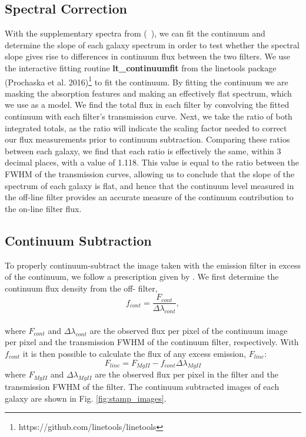 \documentclass[twocolumn]{aastex61}
\newcommand{\citeth}[1]{(\citeauthor{#1}\ \citeyear{#1})}
\begin{document}
\subsection{Spectral Correction}
With the supplementary spectra from \citeth{Rubin_2014}, we can fit the continuum and determine the slope of each galaxy spectrum in order to test whether the spectral slope gives rise to differences in continuum flux between the two filters. We use the interactive fitting routine \textbf{lt\_continuumfit} from the linetools package (Prochaska et al. 2016)\footnote{https://github.com/linetools/linetools}\nocite{Prochaska2016} to fit the continuum. By fitting the continuum we are masking the absorption features and making an effectively flat spectrum, which we use as a model. We find the total flux in each filter by convolving the fitted continuum with each filter's transmission curve. Next, we take the ratio of both integrated totals, as the ratio will indicate the scaling factor needed to correct our flux measurements prior to continuum subtraction. Comparing these ratios between each galaxy, we find that each ratio is effectively the same, within 3 decimal places, with a value of 1.118. This value is equal to the ratio between the FWHM of the transmission curves, allowing us to conclude that the slope of the spectrum of each galaxy is flat, and hence that the continuum level measured in the off-line filter provides an accurate measure of the continuum contribution to the on-line filter flux.

\subsection{Continuum Subtraction}\label{sec.cont_sub}
To properly continuum-subtract the image taken with the emission filter in excess of the continuum, we follow a prescription given by \cite{Battaia_2015}. 
We first determine the continuum flux density from the off- filter,
\begin{equation}
f_{cont}=\frac{F_{cont}}{\Delta \lambda_{cont}},
\end{equation}\\
where $F_{cont}$ and $\Delta \lambda_{cont}$ are the observed flux per pixel of the continuum image per pixel and the transmission FWHM of the continuum filter, respectively. With $f_{cont}$ it is then possible to calculate the flux of any excess emission, $F_{line}$:
\begin{equation}
F_{line}=F_{MgII}-f_{cont} \Delta \lambda_{MgII}
\label{eq:subtraction}
\end{equation}
where $F_{MgII}$ and $\Delta \lambda_{MgII}$ are the observed flux per pixel in the  filter and the transmission FWHM of the  filter. The continuum subtracted images of each galaxy are shown in Fig. \ref{fig:stamp_images}.
\end{document}
